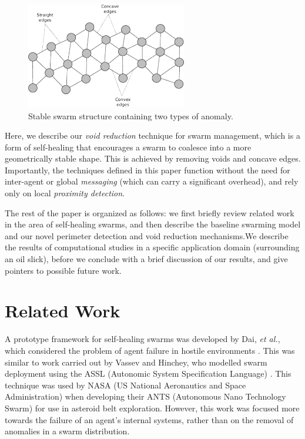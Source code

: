 \documentclass[letterpaper]{article}
\begin{document}
\begin{figure}
\begin{center}
\includegraphics[width=7cm]{figures/SwarmStableShape1}
\end{center}
\caption{Stable swarm structure containing two types of anomaly. \label{concave:SwarmStableShape1}}
\end{figure}

Here, we describe our \textit{void reduction} technique for swarm management, which is a form of self-healing that encourages a swarm to coalesce into a more geometrically stable shape. This is achieved by removing voids and concave edges. Importantly, the techniques defined in this paper function without the need for inter-agent or global {\it messaging} (which can carry a significant overhead), and rely only on local {\it proximity detection}.

The rest of the paper is organized as follows: we first briefly review related work in the area of self-healing swarms, and then describe the baseline swarming model and our novel perimeter detection and void reduction mechanisms.We describe the results of computational studies in a specific application domain (surrounding an oil slick), before we conclude with a brief discussion of our results, and give pointers to possible future work.

\section{Related Work \label{sec:RelatedWork}} 

A prototype framework for self-healing swarms was developed by Dai, {\it et al.}, which considered the problem of agent failure in hostile environments \cite{DHMRZ:06}. This was similar to work carried out by Vassev and Hinchey, who modelled swarm deployment using the ASSL (Autonomic System Specification Language) \cite{VH:09}. This technique was used by NASA (US National Aeronautics and Space Administration) when developing their ANTS (Autonomous Nano Technology Swarm) for use in asteroid belt exploration. However, this work was focused more towards the failure of an agent's internal systems, rather than on the removal of anomalies in a swarm distribution. 
\end{document}
